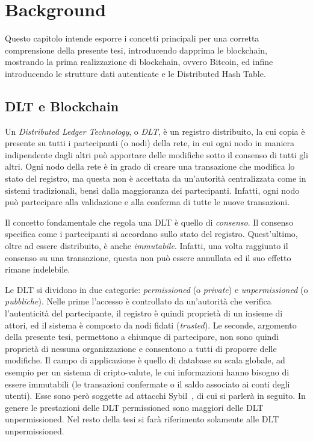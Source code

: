 \chapter{Background}

Questo capitolo intende esporre i concetti principali per una corretta comprensione della presente tesi, introducendo dapprima le blockchain, mostrando la prima realizzazione di blockchain, ovvero Bitcoin, ed infine introducendo le strutture dati autenticate e le Distributed Hash Table.


\section{DLT e Blockchain}\label{sec:blockchain}

Un \emph{Distributed Ledger Technology}, o \emph{DLT}, è un registro distribuito, la cui copia è presente su tutti i partecipanti (o nodi) della rete, in cui ogni nodo in maniera indipendente dagli altri può apportare delle modifiche sotto il consenso di tutti gli altri. Ogni nodo della rete è in grado di creare una transazione che modifica lo stato del registro, ma questa non è accettata da un'autorità centralizzata come in sistemi tradizionali, bensì dalla maggioranza dei partecipanti. Infatti, ogni nodo può partecipare alla validazione e alla conferma di tutte le nuove transazioni.

Il concetto fondamentale che regola una DLT è quello di \emph{consenso}. Il consenso specifica come i partecipanti si accordano sullo stato del registro. Quest'ultimo, oltre ad essere distribuito, è anche \emph{immutabile}. Infatti, una volta raggiunto il consenso su una transazione, questa non può essere annullata ed il suo effetto rimane indelebile.

Le DLT si dividono in due categorie: \emph{permissioned} (o \emph{private}) e \emph{unpermissioned} (o \emph{pubbliche}). Nelle prime l'accesso è controllato da un'autorità che verifica l'autenticità del partecipante, il registro è quindi proprietà di un insieme di attori, ed il sistema è composto da nodi fidati (\emph{trusted}). Le seconde, argomento della presente tesi, permettono a chiunque di partecipare, non sono quindi proprietà di nessuna organizzazione e consentono a tutti di proporre delle modifiche. Il campo di applicazione è quello di database su scala globale, ad esempio per un sistema di cripto-valute, le cui informazioni hanno bisogno di essere immutabili (le transazioni confermate o il saldo associato ai conti degli utenti). Esse sono però soggette ad attacchi Sybil~\cite{douceur2002sybil}, di cui si parlerà in seguito. In genere le prestazioni delle DLT permissioned sono maggiori delle DLT unpermissioned. Nel resto della tesi si farà riferimento solamente alle DLT unpermissioned.

